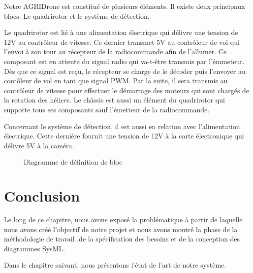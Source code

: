 				Notre AGRIDrone  est constitué de plusieurs éléments. Il existe deux principaux blocs: Le quadrirotor et le système de détection.
				
				Le quadrirotor est lié à une alimentation électrique qui  délivre une tension de 12V au contrôleur de vitesse. Ce dernier transmet 5V au contrôleur de vol qui l'envoi à son tour au récepteur de la radiocommande afin de l'allumer. Ce composant est en attente du signal radio qui va-t-être transmis par l'émmeteur. Dès que ce signal est reçu, le récepteur se charge de le décoder puis l'envoyer au contôleur de vol en tant que signal PWM. Par la suite, il sera transmis au contrôleur de vitesse pour effectuer le démarrage des moteurs qui sont chargés de la rotation des hélices. Le châssis est aussi un élément du quadrirotor qui supporte tous ses composants sauf l'émetteur de la radiocommande.
				
				Concernant le système de détection, il est aussi en relation avec l'alimentation électrique. Cette dernière fournit une tension de 12V à la carte électronique qui délivre 5V à la caméra.
				
					\begin{figure}[H] 
					\begin{center} 
						\centering
					\hspace*{-2.25cm}	
					\end{center}
					
					\caption{Diagramme de définition de bloc}
					
					\end {figure}
				
			   \section{Conclusion}
				Le long de ce chapitre, nous avons exposé la problématique à partir de laquelle nous avons créé l'objectif de notre projet et nous avons montré la phase de la méthodologie de travail ,de la spécification des besoins et de la conception des diagrammes SysML.
				
				Dans le chapitre suivant, nous présentons l'état de l'art de notre système.


	

